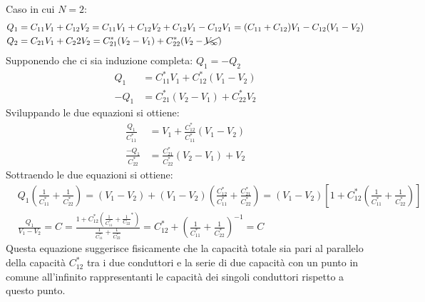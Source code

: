Caso in cui $N=2$:
$$
\begin{aligned}
Q_1 &= C_{11} V_1 + C_{12}V_2 = C_{11}V_1 + C_{12}V_2 + C_{12}V_1 - C_{12}V_1 = (C_{11}+C_{12})V_1 - C_{12}(V_1-V_2)\\
Q_2 &= C_{21}V_1 + C_22 V_2 = C_{21}^*(V_2-V_1) + C_{22}^*(V_2-\cancel{V_{\infty}})
\end{aligned}
$$
Supponendo che ci sia induzione completa: $Q_1 = - Q_2$
$$\begin{aligned}
Q_1 &= C_{11}^*V_1 + C_{12}^*(V_1-V_2) \\
-Q_1 &= C_{21}^*(V_2-V_1) + C_{22}^*V_2
\end{aligned}
$$
Sviluppando le due equazioni si ottiene:
$$\begin{aligned}
\frac{Q_1}{C_{11}^*} &= V_1 + \frac{C_{12}^*}{C_{11}^*}(V_1-V_2)\\
\frac{-Q_1}{C_{22}^*} &= \frac{C_{21}^*}{C_{22}^*}(V_2-V_1) + V_2
\end{aligned}
$$
Sottraendo le due equazioni si ottiene:
$$\begin{aligned}
&Q_1\left(\frac{1}{C_{11}^*}+\frac{1}{C_{22}^*}\right) = (V_1-V_2) + (V_1-V_2)\left(\frac{C_{12}^*}{C_{11}^*} + \frac{C_{21}^*}{C_{22}^*} \right) = (V_1 - V_2)\left[1+C_{12}^*\left(\frac{1}{C_{11}^*}+\frac{1}{C_{22}^*}\right)\right]\\
&\frac{Q_1}{V_1-V_2} = C = \frac{1 + C_{12}^*\left(\frac{1}{C_{11}^*} + \frac{1}{C_22}^*\right)}
{\frac{1}{C_{11}^*}+\frac{1}{C_{22}^*}} = C_{12}^* + \left(\frac{1}{C_{11}^*} + \frac{1}{C_{22}^*}\right)^{-1} = C
\end{aligned}
$$
Questa equazione suggerisce fisicamente che la capacità totale sia pari al parallelo della
capacità $C_{12}^*$ tra i due conduttori e la serie di due capacità con un punto in comune
all'infinito rappresentanti le capacità dei singoli conduttori rispetto a questo punto.

